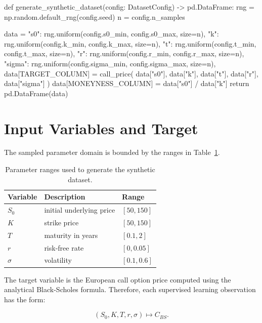 \begin{projectlistingbox}
def generate_synthetic_dataset(config: DatasetConfig) -> pd.DataFrame:
    rng = np.random.default_rng(config.seed)
    n = config.n_samples

    data = {
        "s0": rng.uniform(config.s0_min, config.s0_max, size=n),
        "k": rng.uniform(config.k_min, config.k_max, size=n),
        "t": rng.uniform(config.t_min, config.t_max, size=n),
        "r": rng.uniform(config.r_min, config.r_max, size=n),
        "sigma": rng.uniform(config.sigma_min, config.sigma_max, size=n),
    }
    data[TARGET_COLUMN] = call_price(
        data["s0"], data["k"], data["t"], data["r"], data["sigma"]
    )
    data[MONEYNESS_COLUMN] = data["s0"] / data["k"]
    return pd.DataFrame(data)
\end{projectlistingbox}

\section{Input Variables and Target}

The sampled parameter domain is bounded by the ranges in Table~\ref{tab:dataset-ranges}.

\begin{table}[H]
    \centering
    \begin{tabular}{lll}
        \toprule
        Variable & Description              & Range        \\
        \midrule
        $S_0$    & initial underlying price & $[50, 150]$  \\
        $K$      & strike price             & $[50, 150]$  \\
        $T$      & maturity in years        & $[0.1, 2]$   \\
        $r$      & risk-free rate           & $[0, 0.05]$  \\
        $\sigma$ & volatility               & $[0.1, 0.6]$ \\
        \bottomrule
    \end{tabular}
    \caption{Parameter ranges used to generate the synthetic dataset.}
    \label{tab:dataset-ranges}
\end{table}

The target variable is the European call option price computed using the analytical Black-Scholes formula.
Therefore, each supervised learning observation has the form:

\begin{equation}
    (S_0, K, T, r, \sigma) \longmapsto C_{BS}.
\end{equation}

